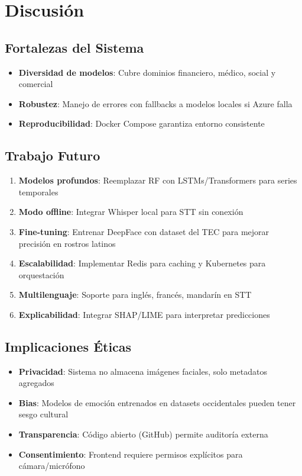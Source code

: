 \section{Discusión}

\subsection{Fortalezas del Sistema}

\begin{itemize}
    \item \textbf{Diversidad de modelos}: Cubre dominios financiero, médico, social y comercial
    \item \textbf{Robustez}: Manejo de errores con fallbacks a modelos locales si Azure falla
    \item \textbf{Reproducibilidad}: Docker Compose garantiza entorno consistente
\end{itemize}

\subsection{Trabajo Futuro}

\begin{enumerate}
    \item \textbf{Modelos profundos}: Reemplazar RF con LSTMs/Transformers para series temporales
    \item \textbf{Modo offline}: Integrar Whisper local para STT sin conexión
    \item \textbf{Fine-tuning}: Entrenar DeepFace con dataset del TEC para mejorar precisión en rostros latinos
    \item \textbf{Escalabilidad}: Implementar Redis para caching y Kubernetes para orquestación
    \item \textbf{Multilenguaje}: Soporte para inglés, francés, mandarín en STT
    \item \textbf{Explicabilidad}: Integrar SHAP/LIME para interpretar predicciones
\end{enumerate}

\subsection{Implicaciones Éticas}

\begin{itemize}
    \item \textbf{Privacidad}: Sistema no almacena imágenes faciales, solo metadatos agregados
    \item \textbf{Bias}: Modelos de emoción entrenados en datasets occidentales pueden tener sesgo cultural
    \item \textbf{Transparencia}: Código abierto (GitHub) permite auditoría externa
    \item \textbf{Consentimiento}: Frontend requiere permisos explícitos para cámara/micrófono
\end{itemize}

